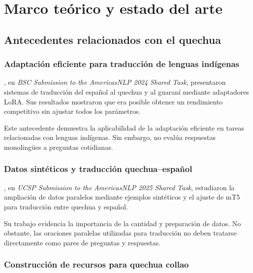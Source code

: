 \chapter{Marco teórico y estado del arte}\label{marco-teuxf3rico-y-estado-del-arte}

\section{Antecedentes relacionados con el quechua}\label{antecedentes-relacionados-con-el-quechua}

\subsection{Adaptación eficiente para traducción de lenguas indígenas}\label{adaptaciuxf3n-eficiente-para-traducciuxf3n-de-lenguas-induxedgenas}

\textcite{GarciaGilabert2024}, en \emph{BSC Submission to the AmericasNLP 2024 Shared Task}, presentaron sistemas de traducción del español al quechua y al guaraní mediante adaptadores LoRA. Sus resultados mostraron que era posible obtener un rendimiento competitivo sin ajustar todos los parámetros.

Este antecedente demuestra la aplicabilidad de la adaptación eficiente en tareas relacionadas con lenguas indígenas. Sin embargo, no evalúa respuestas monolingües a preguntas cotidianas.

\subsection{Datos sintéticos y traducción quechua--español}\label{datos-sintuxe9ticos-y-traducciuxf3n-quechuaespauxf1ol}

\textcite{AsilloCongora2025}, en \emph{UCSP Submission to the AmericasNLP 2025 Shared Task}, estudiaron la ampliación de datos paralelos mediante ejemplos sintéticos y el ajuste de mT5 para traducción entre quechua y español.

Su trabajo evidencia la importancia de la cantidad y preparación de datos. No obstante, las oraciones paralelas utilizadas para traducción no deben tratarse directamente como pares de preguntas y respuestas.

\subsection{Construcción de recursos para quechua collao}\label{construcciuxf3n-de-recursos-para-quechua-collao}

